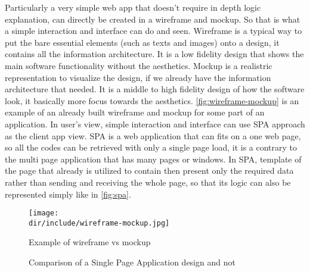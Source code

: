 Particularly a very simple web app that doesn't require in depth logic explanation, can directly be created in a wireframe and mockup.
So that is what a simple interaction and interface can do and seen.
Wireframe is a typical way to put the bare essential elements (such as texts and images) onto a design, it contains all the information architecture.
It is a low fidelity design that shows the main software functionality without the aesthetics.
Mockup is a realistric representation to visualize the design, if we already have the information architecture that needed.
It is a middle to high fidelity design of how the software look, it basically more focus towards the aesthetics.
\autoref{fig:wireframe-mockup} is an example of an already built wireframe and mockup for some part of an application.
In user's view, simple interaction and interface can use \ac{SPA} approach as the client app view.
\ac{SPA} is a web application that can fits on a one web page, so all the codes can be retrieved with only a single page load, it is a contrary to the multi page application that has many pages or windows.
In \ac{SPA}, template of the page that already is utilized to contain then present only the required data rather than sending and receiving the whole page, so that its logic can also be represented simply like in \autoref{fig:spa}.

\begin{figure}[htbp]
    \centering
    \texttt{[image: \\dir/include/wireframe-mockup.jpg]}
    \caption[Wireframe vs Mockup Example]{Example of wireframe vs mockup \autocite{Trentini2015WM}}
    \label{fig:wireframe-mockup}
\end{figure}

\begin{figure}[htbp]
    \centering
    \caption[Single Page Application design comparison]{Comparison of a Single Page Application design and not}
    \label{fig:spa}
\end{figure}
